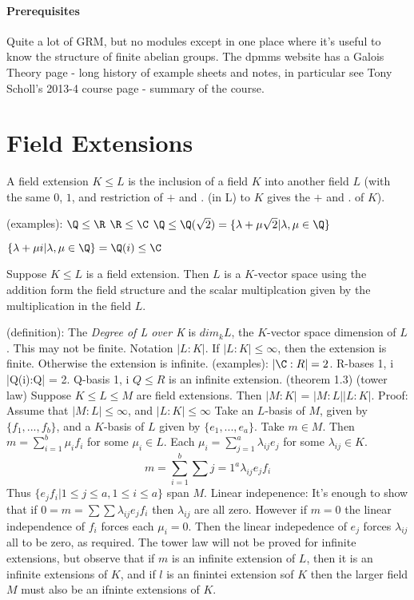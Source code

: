 \documentclass{article}
\begin{document}
\paragraph{Prerequisites} Quite a lot of GRM, but no modules except in one place where it's useful to know the structure of finite abelian groups. The dpmms website has a Galois Theory page - long history of example sheets and notes, in particular see Tony Scholl's 2013-4 course page - summary of the course.

\section{Field Extensions}
\begin{nthm}
  A field extension $K \leq L$ is the inclusion of a field $K$ into another field $L$ (with the same $0$, $1$, and restriction of $+$ and $.$ (in L) to $K$ gives the $+$ and $.$ of $K$).
\end{nthm}

(examples): $\Q \leq \R$
$\R \leq \C$
$\Q \leq \Q(\sqrt{2}) = \{\lambda + \mu \sqrt{2} \vert \lambda, \mu \in \Q\}$

$\{\lambda + \mu i \vert \lambda, \mu \in \Q\} = \Q(i) \leq \C$


Suppose $K \leq L$ is a field extension. Then $L$ is a $K$-vector space using the addition form the field structure and the scalar multiplcation given by the multiplication in the field $L$.

(definition): The \emph{Degree of L over K} is $dim_k L$, the $K$-vector space dimension of $L$. This may not be finite. Notation $|L:K|$. If $|L:K| \leq \infty$, then the extension is finite. Otherwise the extension is infinite.
(examples): $|\C:R| = 2$. R-bases 1, i
|Q(i):Q| = 2. Q-basis 1, i
$Q \leq R$ is an infinite extension.
(theorem 1.3) (tower law)
Suppose $K \leq L \leq M$ are field extensions. Then $|M:K|$ = $|M:L||L:K|$.
Proof: Assume that $|M:L| \le \infty$, and $|L:K| \le \infty$
Take an $L$-basis of $M$, given by $\{f_1, ..., f_b\}$, and a $K$-basis of $L$ given by $\{e_1, ..., e_a\}$.
Take $m \in M$. Then $m = \sum_{i=1}^b \mu_i f_i$ for some $\mu_i \in L$.  Each $\mu_i = \sum_{j=1}^a \lambda_{ij} e_j$ for some $\lambda_{ij} \in K$.
\begin{equation}
    m = \sum_{i=1}^b \sum{j=1}^a \lambda_{ij} e_j f_i
\end{equation}
Thus $\{e_j f_i \vert 1 \leq j \leq a, 1 \leq i \leq a\}$ span $M$.
Linear indepenence:
    It's enough to show that if $0 = m = \sum \sum \lambda_{ij} e_j f_i$ then $\lambda_{ij}$ are all zero. However if $m = 0$ the linear independence of $f_i$ forces each $\mu_i = 0$. Then the linear indepedence of $e_j$ forces $\lambda_{ij}$ all to be zero, as required.
The tower law will not be proved for infinite extensions, but observe that if $m$ is an infinite extension of $L$, then it is an infinite extensions of $K$, and if $l$ is an finintei extension sof $K$ then the larger field $M$ must also be an ifninte extensions of $K$.
\end{document}
